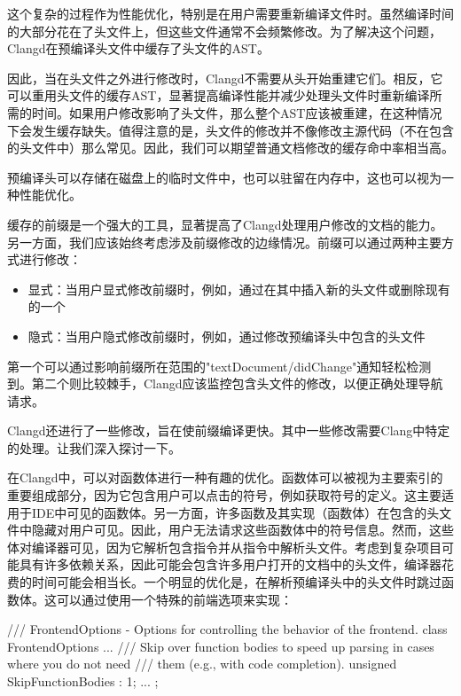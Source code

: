 这个复杂的过程作为性能优化，特别是在用户需要重新编译文件时。虽然编译时间的大部分花在了头文件上，但这些文件通常不会频繁修改。为了解决这个问题，Clangd在预编译头文件中缓存了头文件的AST。

因此，当在头文件之外进行修改时，Clangd不需要从头开始重建它们。相反，它可以重用头文件的缓存AST，显著提高编译性能并减少处理头文件时重新编译所需的时间。如果用户修改影响了头文件，那么整个AST应该被重建，在这种情况下会发生缓存缺失。值得注意的是，头文件的修改并不像修改主源代码（不在包含的头文件中）那么常见。因此，我们可以期望普通文档修改的缓存命中率相当高。

预编译头可以存储在磁盘上的临时文件中，也可以驻留在内存中，这也可以视为一种性能优化。

缓存的前缀是一个强大的工具，显著提高了Clangd处理用户修改的文档的能力。另一方面，我们应该始终考虑涉及前缀修改的边缘情况。前缀可以通过两种主要方式进行修改：

\begin{itemize}
\item
显式：当用户显式修改前缀时，例如，通过在其中插入新的头文件或删除现有的一个

\item
隐式：当用户隐式修改前缀时，例如，通过修改预编译头中包含的头文件
\end{itemize}

第一个可以通过影响前缀所在范围的"textDocument/didChange"通知轻松检测到。第二个则比较棘手，Clangd应该监控包含头文件的修改，以便正确处理导航请求。

Clangd还进行了一些修改，旨在使前缀编译更快。其中一些修改需要Clang中特定的处理。让我们深入探讨一下。


在Clangd中，可以对函数体进行一种有趣的优化。函数体可以被视为主要索引的重要组成部分，因为它包含用户可以点击的符号，例如获取符号的定义。这主要适用于IDE中可见的函数体。另一方面，许多函数及其实现（函数体）在包含的头文件中隐藏对用户可见。因此，用户无法请求这些函数体中的符号信息。然而，这些体对编译器可见，因为它解析包含指令并从指令中解析头文件。考虑到复杂项目可能具有许多依赖关系，因此可能会包含许多用户打开的文档中的头文件，编译器花费的时间可能会相当长。一个明显的优化是，在解析预编译头中的头文件时跳过函数体。这可以通过使用一个特殊的前端选项来实现：

\begin{cpp}
/// FrontendOptions - Options for controlling the behavior of the frontend.
class FrontendOptions {
  ...
  /// Skip over function bodies to speed up parsing in cases where you do not need
  /// them (e.g., with code completion).
  unsigned SkipFunctionBodies : 1;
  ...
};
\end{cpp}

